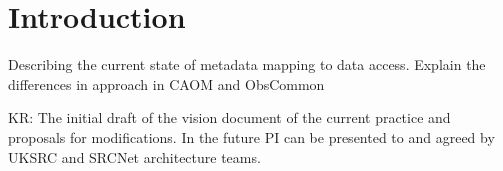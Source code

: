\section{Introduction}\label{sec:intro}

Describing the current state of metadata mapping to data access. Explain the differences in approach in CAOM and ObsCommon

KR: The initial draft of the vision document of the current practice and proposals for modifications. In the future PI can be presented to and agreed by UKSRC and SRCNet architecture teams.
